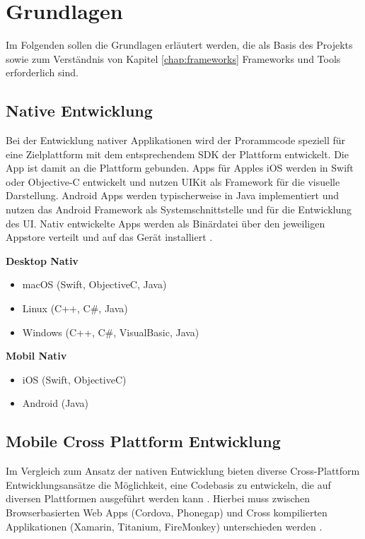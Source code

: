 
\chapter{Grundlagen}

Im Folgenden sollen die Grundlagen erläutert werden, die als Basis des Projekts sowie zum Verständnis von Kapitel \ref{chap:frameworks} Frameworks und Tools erforderlich sind.


\section{Native Entwicklung}

Bei der Entwicklung nativer Applikationen wird der Prorammcode speziell für eine Zielplattform mit dem entsprechendem \ac{SDK} der Plattform entwickelt.
Die App ist damit an die Plattform gebunden. Apps für Apples iOS werden in Swift oder Objective-C entwickelt und nutzen UIKit als Framework für die visuelle Darstellung.
Android Apps werden typischerweise in Java implementiert und nutzen das Android Framework als Systemschnittstelle und für die Entwicklung des \ac{UI}.
Nativ entwickelte Apps werden als Binärdatei über den jeweiligen Appstore verteilt und auf das Gerät installiert \cite{Heitkoetter2013}.

\vspace{0.3cm}
\textbf{Desktop Nativ}
\begin{itemize}
\item macOS (Swift, ObjectiveC, Java)
\item Linux (C++, C\#, Java)
\item Windows (C++, C\#, VisualBasic, Java)
\end{itemize}
\vspace{0.3cm}

\textbf{Mobil Nativ}
\begin{itemize}
\item iOS (Swift, ObjectiveC)
\item Android (Java)
\end{itemize}
\vspace{0.3cm}

\section{Mobile Cross Plattform Entwicklung}

Im Vergleich zum Ansatz der nativen Entwicklung bieten diverse Cross-Plattform Entwicklungsansätze die Möglichkeit, eine Codebasis zu entwickeln,
die auf diversen Plattformen ausgeführt werden kann \cite{Heitkoetter2013}.
Hierbei muss zwischen Browserbasierten Web Apps (Cordova, Phonegap) und Cross kompilierten Applikationen (Xamarin, Titanium, FireMonkey) unterschieden werden
\cite{Xamar84:online}.

